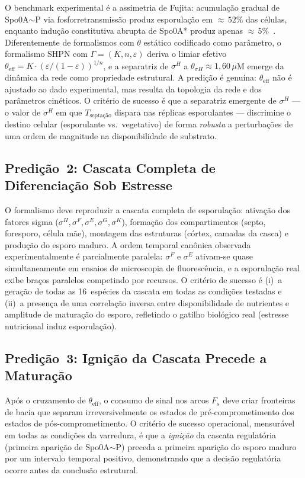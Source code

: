 O benchmark experimental é a assimetria de Fujita: acumulação gradual de
Spo0A${\sim}$P via fosforretransmissão produz esporulação em ${\approx}\,52\%$
das células, enquanto indução constitutiva abrupta de Spo0A* produz apenas
${\approx}\,5\%$~\cite{Fujita2005}. Diferentemente de formalismos com $\theta$
estático codificado como parâmetro, o formalismo SHPN com
$\Gamma = (K, n, \varepsilon)$ deriva o limiar efetivo
$\theta_{\text{eff}} = K \cdot (\varepsilon / (1 - \varepsilon))^{1/n}$,
e a separatriz de $\sigma^H$ a $\theta_{\sigma H} \approx 1{,}60\,\mu$M
emerge da dinâmica da rede como propriedade estrutural.
A predição é genuína: $\theta_{\text{eff}}$ não é ajustado ao dado
experimental, mas resulta da topologia da rede e dos parâmetros cinéticos.
O critério de sucesso é que a separatriz emergente de $\sigma^H$ --- o valor
de $\sigma^H$ em que $T_{\text{septação}}$ dispara nas réplicas esporulantes
--- discrimine o destino celular (esporulante vs.\ vegetativo) de forma
\emph{robusta} a perturbações de uma ordem de magnitude na disponibilidade
de substrato.

\subsection{Predição~2: Cascata Completa de Diferenciação Sob Estresse}

O formalismo deve reproduzir a cascata completa de esporulação: ativação
dos fatores sigma ($\sigma^H, \sigma^F, \sigma^E, \sigma^G, \sigma^K$),
formação dos compartimentos (septo, foresporo, célula mãe), montagem das
estruturas (córtex, camadas da casca) e produção do esporo maduro.
A ordem temporal canônica observada experimentalmente é parcialmente
paralela: $\sigma^F$ e $\sigma^E$ ativam-se quase simultaneamente em
ensaios de microscopia de fluorescência, e a esporulação real exibe
braços paralelos competindo por recursos.
O critério de sucesso é (i)~a geração de todas as 16~espécies da cascata
em todas as condições testadas e (ii)~a presença de uma correlação
inversa entre disponibilidade de nutrientes e amplitude de maturação do
esporo, refletindo o gatilho biológico real (estresse nutricional induz
esporulação).

\subsection{Predição~3: Ignição da Cascata Precede a Maturação}

Após o cruzamento de $\theta_{\text{eff}}$, o consumo de sinal nos arcos
$F_s$ deve criar fronteiras de bacia que separam irreversivelmente os estados
de pré-comprometimento dos estados de pós-comprometimento.
O critério de sucesso operacional, mensurável em todas as condições da
varredura, é que a \emph{ignição} da cascata regulatória (primeira
aparição de Spo0A${\sim}$P) preceda a primeira aparição do esporo maduro
por um intervalo temporal positivo, demonstrando que a decisão
regulatória ocorre antes da conclusão estrutural.


